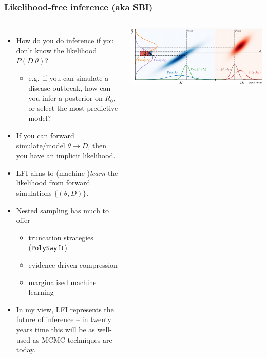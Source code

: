 \documentclass[aspectratio=169]{beamer}
\begin{document}
\begin{frame}
    \frametitle{Likelihood-free inference (aka SBI)}

    \vspace{10pt}
    \begin{columns}
        \vspace{-10pt}
        \begin{itemize}
            \item How do you do inference if you don't know the likelihood $P(D|\theta)$?
                \begin{itemize}
                    \item e.g.\ if you can simulate a disease outbreak, how can you infer a posterior on $R_0$, or select the most predictive model?
                \end{itemize}
            \item If you can forward simulate/model $\theta\to D$, then you have an implicit likelihood.
            \item LFI aims to (machine-)\emph{learn} the likelihood from forward simulations $\{(\theta,D)\}$.
            \item Nested sampling has much to offer
                \begin{itemize}
                    \item truncation strategies (\texttt{PolySwyft})
                    \item evidence driven compression
                    \item marginalised machine learning
                \end{itemize}
            \item In my view, LFI represents the future of inference -- in twenty years time this will be as well-used as MCMC techniques are today.
        \end{itemize}
        \includegraphics[width=\textwidth]{figures/noisy.pdf}

\end{columns}
\end{frame}
\end{document}
